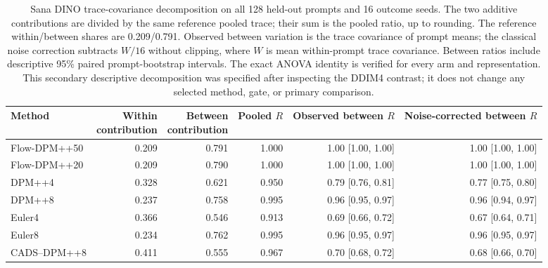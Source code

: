 \begin{table}[t]
\centering\footnotesize
\setlength{\tabcolsep}{4pt}
\begin{tabular}{lrrrrr}
\toprule
Method & \shortstack{Within\\contribution} & \shortstack{Between\\contribution} & \shortstack{Pooled\\$R$} & \shortstack{Observed\\between $R$} & \shortstack{Noise-corrected\\between $R$} \\
\midrule
Flow-DPM++50 & 0.209 & 0.791 & 1.000 & 1.00 [1.00, 1.00] & 1.00 [1.00, 1.00] \\
Flow-DPM++20 & 0.209 & 0.790 & 1.000 & 1.00 [1.00, 1.00] & 1.00 [1.00, 1.00] \\
DPM++4 & 0.328 & 0.621 & 0.950 & 0.79 [0.76, 0.81] & 0.77 [0.75, 0.80] \\
DPM++8 & 0.237 & 0.758 & 0.995 & 0.96 [0.95, 0.97] & 0.96 [0.94, 0.97] \\
Euler4 & 0.366 & 0.546 & 0.913 & 0.69 [0.66, 0.72] & 0.67 [0.64, 0.71] \\
Euler8 & 0.234 & 0.762 & 0.995 & 0.96 [0.95, 0.97] & 0.96 [0.95, 0.97] \\
CADS--DPM++8 & 0.411 & 0.555 & 0.967 & 0.70 [0.68, 0.72] & 0.68 [0.66, 0.70] \\
\bottomrule
\end{tabular}
\caption{Sana DINO trace-covariance decomposition on all 128 held-out prompts and 16 outcome seeds. The two additive contributions are divided by the same reference pooled trace; their sum is the pooled ratio, up to rounding. The reference within/between shares are 0.209/0.791. Observed between variation is the trace covariance of prompt means; the classical noise correction subtracts $W/16$ without clipping, where $W$ is mean within-prompt trace covariance. Between ratios include descriptive 95\% paired prompt-bootstrap intervals. The exact ANOVA identity is verified for every arm and representation. This secondary descriptive decomposition was specified after inspecting the DDIM4 contrast; it does not change any selected method, gate, or primary comparison.}
\label{tab:flow_test_anova}
\end{table}
